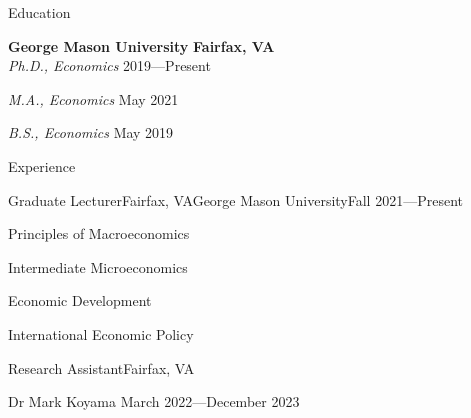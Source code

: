 \documentclass{resume} %
\begin{document}

\begin{rSection}{Education}

    \textbf{George Mason University} \hfill \textbf{Fairfax, VA} \\ 
    \textit{Ph.D., Economics} \hfill {2019---Present}

    \textit{M.A., Economics} \hfill {May 2021}

    \textit{B.S., Economics} \hfill {May 2019}

\end{rSection}


\begin{rSection}{Experience}

    \begin{rSubsection}{Graduate Lecturer}{Fairfax, VA}{George Mason University}{\textup{Fall 2021---Present}}
        \item Principles of Macroeconomics
        \item Intermediate Microeconomics
        \item Economic Development
        \item International Economic Policy
    \end{rSubsection}
    \vspace{-1mm} %
    \begin{rSubsection}{Research Assistant}{Fairfax, VA}{}{}
        \item[] \hspace{-5mm} Dr Mark Koyama \hfill{March 2022---December 2023}
    \end{rSubsection}

\end{rSection}

\end{document}
